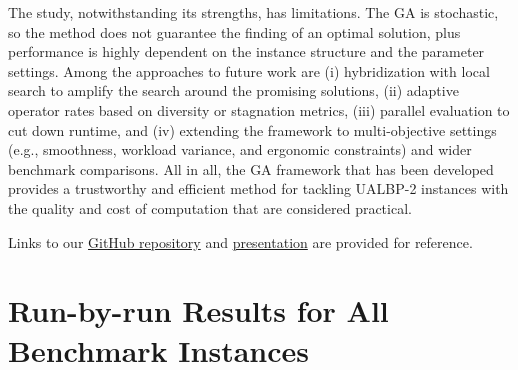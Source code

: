 \documentclass[12pt,a4paper]{article}
\begin{document}
The study, notwithstanding its strengths, has limitations. The GA is stochastic, so the method does not guarantee the finding of an optimal solution, plus performance is highly dependent on the instance structure and the parameter settings. Among the approaches to future work are (i) hybridization with local search to amplify the search around the promising solutions, (ii) adaptive operator rates based on diversity or stagnation metrics, (iii) parallel evaluation to cut down runtime, and (iv) extending the framework to multi-objective settings (e.g., smoothness, workload variance, and ergonomic constraints) and wider benchmark comparisons. All in all, the GA framework that has been developed provides a trustworthy and efficient method for tackling UALBP-2 instances with the quality and cost of computation that are considered practical.
\newpage





\newpage


\appendix

Links to our \href{https://github.com/firuzeipekyildirim/heuristic_algorithms_UALBP2}{GitHub repository} and \href{https://www.canva.com/design/DAG7TFILaw4/JY3xT5iSRCATj8WaC7FwzA/edit?utm_content=DAG7TFILaw4&utm_campaign=designshare&utm_medium=link2&utm_source=sharebutton}{presentation} are provided for reference.

\clearpage


\section{Run-by-run Results for All Benchmark Instances}
\label{app:run-by-run}
\end{document}
